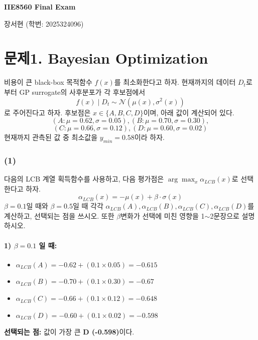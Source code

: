\documentclass[11pt]{article}
\begin{document}
\begin{center}
    {\LARGE\bfseries IIE8560 Final Exam \par}
    \vspace{1em}
    {\large 장서현 (학번: 2025324096) \par}
\end{center}
\vspace{0.5em}

\section*{문제1. Bayesian Optimization}
비용이 큰 black-box 목적함수 $f(x)$를 최소화한다고 하자. 현재까지의 데이터 $D_t$로부터 GP surrogate의 사후분포가 각 후보점에서
\[ f(x) \mid D_t \sim \mathcal{N}(\mu(x),\sigma^2(x)) \]
로 주어진다고 하자. 후보점은 $x \in \{A, B, C, D\}$이며, 아래 값이 계산되어 있다. 
\[(A: \mu=0.62, \sigma=0.05),(B: \mu=0.70, \sigma=0.30),\] 
\[(C: \mu=0.66, \sigma=0.12),(D: \mu=0.60, \sigma=0.02)\]
현재까지 관측된 값 중 최소값을 $y_{min}=0.58$이라 하자.

\subsubsection*{(1)}
다음의 LCB 계열 획득함수를 사용하고, 다음 평가점은 $\arg\max_x \alpha_{LCB}(x)$로 선택한다고 하자.
\[\alpha_{LCB}(x)=-\mu(x)+\beta \cdot \sigma(x)\]
$\beta=0.1$일 때와 $\beta=0.5$일 때 각각 $\alpha_{LCB}(A), \alpha_{LCB}(B), \alpha_{LCB}(C), \alpha_{LCB}(D)$를 계산하고, 선택되는 점을 쓰시오. 또한 $\beta$변화가 선택에 미친 영향을 1$\sim$2문장으로 설명하시오.

\paragraph{1) $\beta = 0.1$ 일 때:}
\begin{itemize}
    \item $\alpha_{LCB}(A) = -0.62 + (0.1 \times 0.05) = -0.615$
    \item $\alpha_{LCB}(B) = -0.70 + (0.1 \times 0.30) = -0.67$
    \item $\alpha_{LCB}(C) = -0.66 + (0.1 \times 0.12) = -0.648$
    \item $\alpha_{LCB}(D) = -0.60 + (0.1 \times 0.02) = -0.598$
\end{itemize}
\textbf{선택되는 점:} 값이 가장 큰 \textbf{D (-0.598)}이다.
\end{document}
